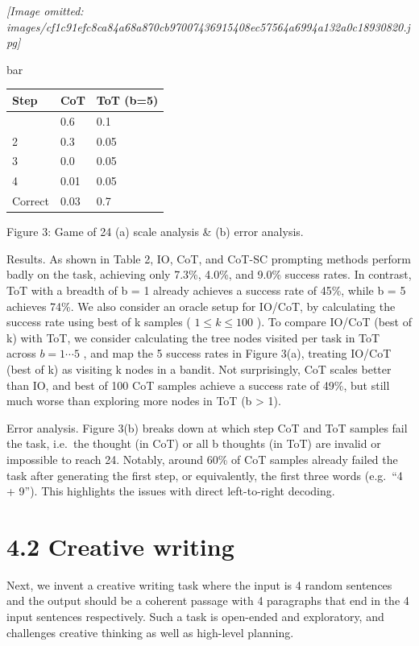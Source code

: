 \documentclass[
]{article}
\newcounter{none} %
\begin{document}
\textit{[Image omitted: images/cf1c91efc8ca84a68a870cb97007436915408ec57564a6994a132a0c18930820.jpg]}

bar

{\def\LTcaptype{none} %
\begin{longtable}[]{@{}lll@{}}
\toprule\noalign{}
Step & CoT & ToT (b=5) \\
\midrule\noalign{}
\endhead
\bottomrule\noalign{}
\endlastfoot
1 & 0.6 & 0.1 \\
2 & 0.3 & 0.05 \\
3 & 0.0 & 0.05 \\
4 & 0.01 & 0.05 \\
Correct & 0.03 & 0.7 \\
\end{longtable}
}

Figure 3: Game of 24 (a) scale analysis \& (b) error analysis.

Results. As shown in Table 2, IO, CoT, and CoT-SC prompting methods
perform badly on the task, achieving only 7.3\%, 4.0\%, and 9.0\%
success rates. In contrast, ToT with a breadth of b = 1 already achieves
a success rate of 45\%, while b = 5 achieves 74\%. We also consider an
oracle setup for IO/CoT, by calculating the success rate using best of k
samples ( \(1 \leq k \leq 100\) ). To compare IO/CoT (best of k) with
ToT, we consider calculating the tree nodes visited per task in ToT
across \(b = 1 \cdots 5\) , and map the 5 success rates in Figure 3(a),
treating IO/CoT (best of k) as visiting k nodes in a bandit. Not
surprisingly, CoT scales better than IO, and best of 100 CoT samples
achieve a success rate of 49\%, but still much worse than exploring more
nodes in ToT (b \textgreater{} 1).

Error analysis. Figure 3(b) breaks down at which step CoT and ToT
samples fail the task, i.e.~the thought (in CoT) or all b thoughts (in
ToT) are invalid or impossible to reach 24. Notably, around 60\% of CoT
samples already failed the task after generating the first step, or
equivalently, the first three words (e.g.~``4 + 9''). This highlights
the issues with direct left-to-right decoding.

\section{4.2 Creative writing}\label{creative-writing}

Next, we invent a creative writing task where the input is 4 random
sentences and the output should be a coherent passage with 4 paragraphs
that end in the 4 input sentences respectively. Such a task is
open-ended and exploratory, and challenges creative thinking as well as
high-level planning.
\end{document}
